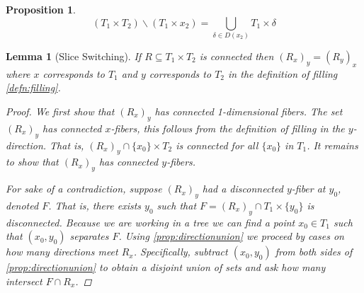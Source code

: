 \documentclass[12pt,parskip=full]{report}
\theoremstyle{plain}
\newtheorem{lem}[thm]{Lemma}
\newtheorem{prop}[thm]{Proposition}
\theoremstyle{definition}
\newcommand{\rxy}{(R_x)_y}
\begin{document}
\begin{prop}
\label{prop:sliceunion}
\[ \left(T_1 \times T_2\right) \smallsetminus \left(T_1\times x_2\right) = \bigcup_{\delta\in D(x_2)} T_1\times \delta\]
\end{prop}


\begin{lem}
    [Slice Switching]
    \label{lem:sliceswitching}
    If \(R \subseteq T_{1} \times T_{2}\) is connected then \( \left( R_{x} \right)_{y} = \left( R_{y} \right)_{x}\) where $x$ corresponds to $T_1$ and $y$ corresponds to $T_2$ in the definition of filling \ref{defn:filling}.
    \begin{proof}
        We first show that $\rxy$ has connected 1-dimensional fibers. The set $\rxy$ has connected $x$-fibers, this follows from the definition of filling in the $y$-direction. That is, $\left( R_{x} \right)_{y} \cap \{x_0\} \times T_2$ is connected for all $\{x_0\}$ in $T_1$. It remains to show that \(\rxy\) has connected $y$-fibers.
        
        For sake of a contradiction, suppose \(\rxy\) had a disconnected $y$-fiber at $y_0$, denoted $F$. That is, there exists $y_0$ such that \(F = \left( R_{x} \right)_{y}\cap T_1 \times \{y_0\}\) is disconnected. Because we are working in a tree we can find a point \(x_0\in T_1\)  such that \((x_0,y_0)\)  separates \(F\). Using \ref{prop:directionunion} we proceed by cases on how many directions meet $R_x$. Specifically, subtract \((x_0,y_0)\) from both sides of \ref{prop:directionunion} to obtain a disjoint union of sets and ask how many intersect $F \cap R_x$.
        

\end{proof}
\end{lem}
\end{document}
